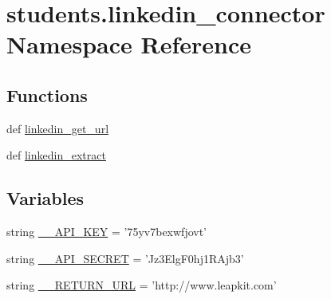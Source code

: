 \hypertarget{namespacestudents_1_1linkedin__connector}{\section{students.\-linkedin\-\_\-connector Namespace Reference}
\label{namespacestudents_1_1linkedin__connector}
}
\subsection*{Functions}
\begin{DoxyCompactItemize}
\item 
def \hyperlink{namespacestudents_1_1linkedin__connector_a441dad30135900c2529bb938b9149d50}{linkedin\-\_\-get\-\_\-url}
\item 
def \hyperlink{namespacestudents_1_1linkedin__connector_a190a3142ce4291a4238261a1f5abcbc7}{linkedin\-\_\-extract}
\end{DoxyCompactItemize}
\subsection*{Variables}
\begin{DoxyCompactItemize}
\item 
string \hyperlink{namespacestudents_1_1linkedin__connector_ab7ab81b54306450170bb51f2eb78634c}{\-\_\-\-\_\-\-A\-P\-I\-\_\-\-K\-E\-Y} = '75yv7bexwfjovt'
\item 
string \hyperlink{namespacestudents_1_1linkedin__connector_aa15a5de7951fe6f777b1937c042aeefe}{\-\_\-\-\_\-\-A\-P\-I\-\_\-\-S\-E\-C\-R\-E\-T} = 'Jz3\-Elg\-F0hj1\-R\-Ajb3'
\item 
string \hyperlink{namespacestudents_1_1linkedin__connector_a6e93c6f0f7a20a83ff1808d3f139f8a5}{\-\_\-\-\_\-\-R\-E\-T\-U\-R\-N\-\_\-\-U\-R\-L} = 'http\-://www.\-leapkit.\-com'
\end{DoxyCompactItemize}


